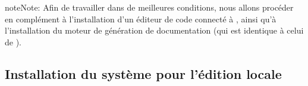 \documentclass[letterpaper,10pt,french]{sphinxmanual}
\begin{document}
\begin{itemize}
\begin{sphinxadmonition}{note}{Note:}
Afin de travailler dans de meilleures conditions, nous allons procéder en complément à l’installation d’un éditeur de code connecté à {\hyperref[\detokenize{readthedocs/glossary:term-github}]{}}, ainsi qu’à l’installation du moteur de génération de documentation {\hyperref[\detokenize{readthedocs/glossary:term-sphinx}]{}} (qui est identique à celui de {\hyperref[\detokenize{readthedocs/glossary:term-read-the-docs}]{}}).
\end{sphinxadmonition}

\end{itemize}


\subsection{Installation du système pour l’édition locale}
\end{document}
